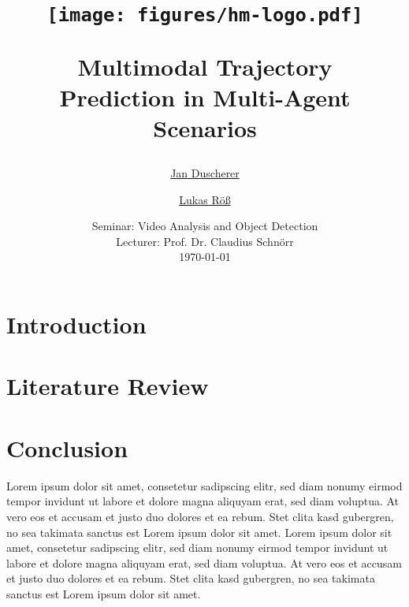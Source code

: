 \documentclass[a4paper,11pt]{report}
\makeatletter
\newcommand{\frontmatter}{%
  \cleardoublepage
  \pagenumbering{roman}}
\newcommand{\mainmatter}{%
  \cleardoublepage
  \pagenumbering{arabic}}
\newcommand{\backmatter}{%
  \if@openright
    \cleardoublepage
  \else
    \clearpage
  \fi}
\makeatother
\begin{document}
	\title{
	\begin{figure}[!ht]
		\centering
			\texttt{[image: figures/hm-logo.pdf]}
	\end{figure}
	\vspace{1cm}
	\Huge Multimodal Trajectory \\ Prediction in Multi-Agent Scenarios \\
	}

	\vspace{1cm}


	\author{\Large \href{mailto:jan.duscherer@hm.edu}{Jan Duscherer} \and \Large \href{mailto:lukas.roess@hm.edu}{Lukas Röß}
	\vspace{1cm}}

	\date{
	\large Seminar: Video Analysis and Object Detection \\
	\vspace{0.8cm}
	\large Lecturer: Prof. Dr. Claudius Schnörr \\
	\vspace{1cm}
	\today
	}

	\maketitle
	\setlength{\parindent}{0pt}

\frontmatter
\vspace{2cm}


\tableofcontents
\listoffigures
\listoftables

\mainmatter
\chapter{Introduction}


\chapter{Literature Review}


\chapter{Conclusion} %
\label{ch:conclusion}
Lorem ipsum dolor sit amet, consetetur sadipscing elitr, sed diam nonumy eirmod tempor invidunt ut labore et dolore magna aliquyam erat, sed diam voluptua. At vero eos et accusam et justo duo dolores et ea rebum. Stet clita kasd gubergren, no sea takimata sanctus est Lorem ipsum dolor sit amet. Lorem ipsum dolor sit amet, consetetur sadipscing elitr, sed diam nonumy eirmod tempor invidunt ut labore et dolore magna aliquyam erat, sed diam voluptua. At vero eos et accusam et justo duo dolores et ea rebum. Stet clita kasd gubergren, no sea takimata sanctus est Lorem ipsum dolor sit amet.

\backmatter



\end{document}
